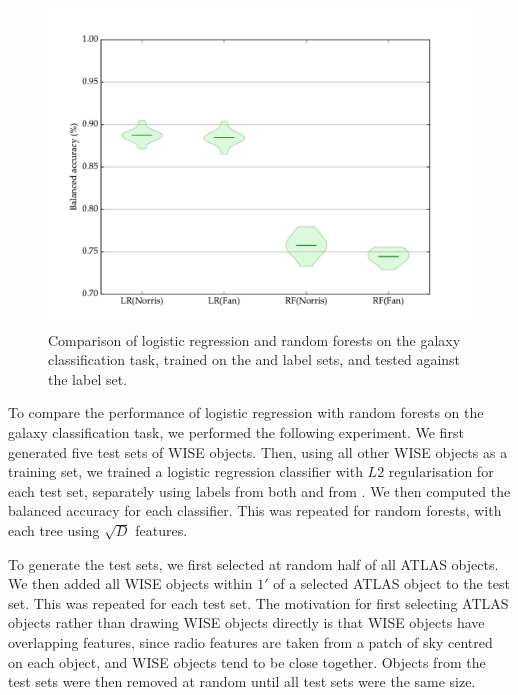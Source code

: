   \begin{figure}
    \centering
    \includegraphics[width=\textwidth]{images/experiments/lr_rf}
    \caption{Comparison of logistic regression and random forests on the galaxy
      classification task, trained on the \citet{norris06} and \citet{fan15}
      label sets, and tested against the \citet{norris06} label set.}
  \end{figure}

  To compare the performance of logistic regression with random forests on the
  galaxy classification task, we performed the following experiment. We first
  generated five test sets of WISE objects. Then, using all other WISE objects
  as a training set, we trained a logistic regression classifier with $L2$
  regularisation for each test set, separately using labels from both
  \citet{norris06} and from \citet{fan15}. We then computed the balanced
  accuracy for each classifier. This was repeated for random forests, with each
  tree using $\sqrt{D}$ features.

  To generate the test sets, we first selected at random half of all ATLAS
  objects. We then added all WISE objects within $1'$ of a selected ATLAS object
  to the test set. This was repeated for each test set. The motivation for first
  selecting ATLAS objects rather than drawing WISE objects directly is that WISE
  objects have overlapping features, since radio features are taken from a patch
  of sky centred on each object, and WISE objects tend to be close together.
  Objects from the test sets were then removed at random until all test sets
  were the same size.


